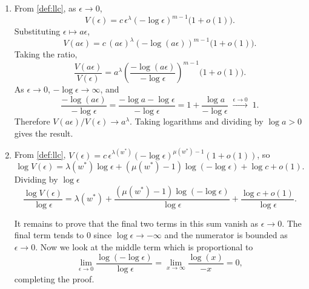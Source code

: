 \documentclass[11pt]{article}
\begin{document}
\begin{solution}
\begin{enumerate}
    \item
    From \cref{def:llc}, as $\epsilon \to 0$,
    \begin{equation*}
        V(\epsilon)
        = c\,\epsilon^{\lambda}(-\log\epsilon)^{m-1}\bigl(1 + o(1)\bigr).
    \end{equation*}
    Substituting $\epsilon \mapsto a\epsilon$,
    \begin{equation*}
        V(a\epsilon)
        = c\,(a\epsilon)^{\lambda}
            (-\log(a\epsilon))^{m-1}\bigl(1 + o(1)\bigr).
    \end{equation*}
    Taking the ratio,
    \begin{equation*}
        \frac{V(a\epsilon)}{V(\epsilon)}
        = a^{\lambda}
          \left(\frac{-\log(a\epsilon)}{-\log\epsilon}\right)^{\!m-1}
          \bigl(1 + o(1)\bigr).
    \end{equation*}
    As $\epsilon \to 0$, $-\log\epsilon \to \infty$, and
    \begin{equation*}
        \frac{-\log(a\epsilon)}{-\log\epsilon}
        = \frac{-\log a - \log\epsilon}{-\log\epsilon}
        = 1 + \frac{\log a}{-\log\epsilon}
        \;\xrightarrow{\epsilon\to 0}\; 1.
    \end{equation*}
    Therefore $V(a\epsilon)/V(\epsilon) \to a^{\lambda}$. Taking
    logarithms and dividing by $\log a > 0$ gives the result.
    \item From \cref{def:llc},
    $V(\epsilon) = c\,\epsilon^{\lambda(w^*)}
        (-\log\epsilon)^{\mu(w^*)-1}(1 + o(1))$,
    so
    \begin{equation*}
        \log V(\epsilon)
        = \lambda(w^*)\log\epsilon
          + (\mu(w^*)-1)\log(-\log\epsilon)
          + \log c + o(1).
    \end{equation*}
    Dividing by $\log\epsilon$
    \begin{equation*}
        \frac{\log V(\epsilon)}{\log\epsilon}
        = \lambda(w^*)
        + \frac{(\mu(w^*)-1)\log(-\log\epsilon)}{\log\epsilon}
        + \frac{\log c + o(1)}{\log\epsilon}.
    \end{equation*}

    It remains to prove that the final two terms in this sum vanish as $\epsilon \to 0$. The final term tends to $0$ since $\log \epsilon \to -\infty$ and the numerator is bounded as $\epsilon \to 0$. Now we look at the middle term which is proportional to
    $$\lim\limits_{\epsilon\to 0} \frac{\log (-\log \epsilon)}{\log \epsilon}=\lim\limits_{x\to \infty} \frac{\log (x)}{-x} = 0,$$ completing the proof. \qedhere

\end{enumerate}
\end{solution}
\end{document}

